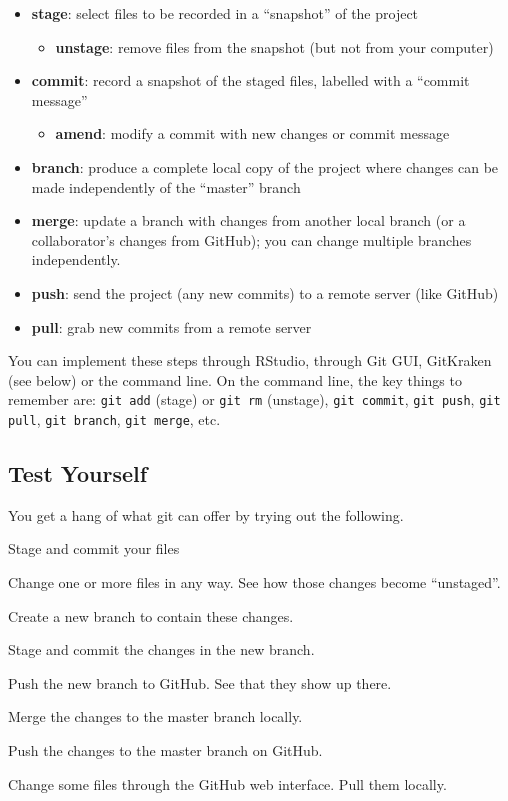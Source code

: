 \documentclass[12pt, a4paper]{article}
\begin{document}
\begin{itemize}\itemsep0em
\item \textbf{stage}: select files to be recorded in a ``snapshot'' of the project
	\begin{itemize}
	\item \textbf{unstage}: remove files from the snapshot (but not from your computer)
	\end{itemize}
\item \textbf{commit}: record a snapshot of the staged files, labelled with a ``commit message''
	\begin{itemize}
	\item \textbf{amend}: modify a commit with new changes or commit message
	\end{itemize}
\item \textbf{branch}: produce a complete local copy of the project where changes can be made independently of the ``master'' branch
\item \textbf{merge}: update a branch with changes from another local branch (or a collaborator's changes from GitHub); you can change multiple branches independently.
\item \textbf{push}: send the project (any new commits) to a remote server (like GitHub)
\item \textbf{pull}: grab new commits from a remote server
\end{itemize}

\noindent You can implement these steps through RStudio, through Git GUI, GitKraken (see below) or the command line. On the command line, the key things to remember are: \texttt{git add} (stage) or \texttt{git rm} (unstage), \texttt{git commit}, \texttt{git push}, \texttt{git pull}, \texttt{git branch}, \texttt{git merge}, etc.

\subsection*{Test Yourself}

You get a hang of what git can offer by trying out the following.

\begin{enumerate*}
\item Stage and commit your files
\item Change one or more files in any way. See how those changes become ``unstaged''.
\item Create a new branch to contain these changes.
\item Stage and commit the changes in the new branch.
\item Push the new branch to GitHub. See that they show up there.
\item Merge the changes to the master branch locally.
\item Push the changes to the master branch on GitHub.
\item Change some files through the GitHub web interface. Pull them locally.
\end{enumerate*}
\end{document}
